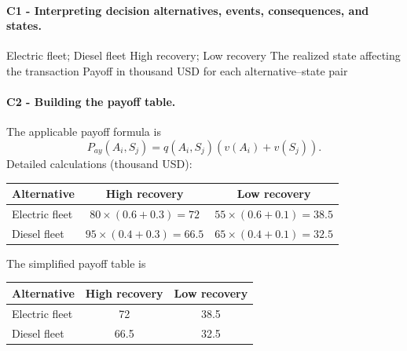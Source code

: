 	\paragraph*{C1 - Interpreting decision alternatives, events, consequences, and states.}
	\label{subsec:problem14-recycling-collection-contract-c1}
	\DecisionElementsTable
	{Electric fleet; Diesel fleet}
	{High recovery; Low recovery}
	{The realized state affecting the transaction}
	{Payoff in thousand USD for each alternative--state pair}

	\paragraph*{C2 - Building the payoff table.}
	\label{subsec:problem14-recycling-collection-contract-c2}
	The applicable payoff formula is
	\[ P_{ay}(A_i,S_j)=q(A_i,S_j)\left(v(A_i)+v(S_j)\right). \]
	Detailed calculations (thousand USD):
	\begin{center}\small
	\begin{tabular}{lcc}
	\toprule
	Alternative & High recovery & Low recovery \\
	\midrule
	Electric fleet & $80\times(0.6+0.3)=72$ & $55\times(0.6+0.1)=38.5$ \\
Diesel fleet & $95\times(0.4+0.3)=66.5$ & $65\times(0.4+0.1)=32.5$ \\
	\bottomrule
	\end{tabular}
	\end{center}
	The simplified payoff table is
	\begin{center}
	\begin{tabular}{lcc}
	\toprule
	Alternative & High recovery & Low recovery \\
	\midrule
	Electric fleet & 72 & 38.5 \\
Diesel fleet & 66.5 & 32.5 \\
	\bottomrule
	\end{tabular}
	\end{center}

